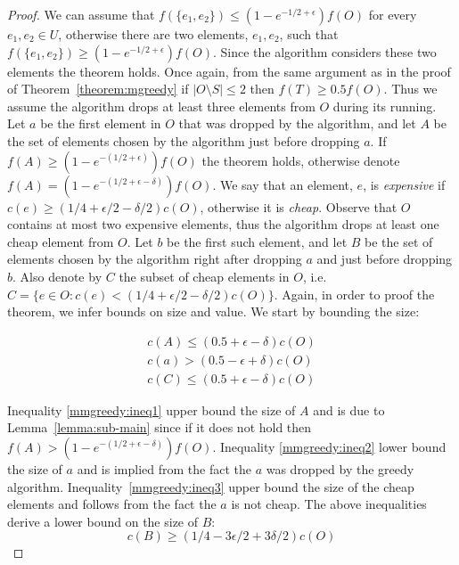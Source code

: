 \def\eps{0.104}
\begin{proof}
We can assume that $f(\{e_1, e_2\}) \leq (1 - e^{-1/2 + \epsilon})f(O)$ 
for every $e_1, e_2 \in U$, otherwise there are two elements, $e_1, e_2$, such that $f(\{e_1, e_2\}) \geq (1 - e^{-1/2 + \epsilon})f(O)$. 
Since the algorithm considers these two elements the theorem holds.
% 
Once again, from the same argument as in the proof of Theorem~\ref{theorem:mgreedy} if $|O \setminus S| \leq 2$ then $f(T) \geq 0.5f(O)$.
Thus we assume the algorithm drops at least three elements from $O$ during its running.
Let $a$ be the first element in $O$ that was dropped by the algorithm, 
and let $A$ be the set of elements chosen by the algorithm just before dropping $a$.
If $f(A) \geq (1 - e^{-(1/2 + \epsilon)})f(O)$ the theorem holds, 
otherwise denote $f(A) = (1 - e^{-(1/2 + \epsilon - \delta)})f(O)$.
We say that an element, $e$, is \emph{expensive} if $c(e) \geq (1/4 + \epsilon/2 - \delta/2)c(O)$, 
otherwise it is \emph{cheap}.
Observe that $O$ contains at most two expensive elements, thus the algorithm drops 
at least one cheap element from $O$. 
Let $b$ be the first such element, and let $B$ be the set of elements chosen by the 
algorithm right after dropping $a$ and just before dropping $b$.
Also denote by $C$ the subset of cheap elements in $O$, 
i.e. $C = \{e \in O : c(e) < (1/4 + \epsilon/2 - \delta/2)c(O)\}$.
Again, in order to proof the theorem, we infer bounds on size and value.
We start by bounding the size:

\begin{align}
\label{mmgreedy:ineq1}
c(A) \leq (0.5 + \epsilon - \delta)c(O)
\\
\label{mmgreedy:ineq2}
c(a) > (0.5 -\epsilon + \delta)c(O)
\\
\label{mmgreedy:ineq3}
c(C) \leq (0.5 + \epsilon - \delta)c(O)
\end{align}

Inequality \ref{mmgreedy:ineq1} upper bound the size of $A$ and is due to Lemma~\ref{lemma:sub-main} since if it does not hold then $f(A) > (1 - e^{-(1/2 + \epsilon - \delta)})f(O)$.
Inequality \ref{mmgreedy:ineq2} lower bound the size of $a$ and is implied from the fact the $a$ was dropped by the greedy algorithm.
Inequality~\ref{mmgreedy:ineq3} upper bound the size of the cheap elements and follows from the fact the $a$ is not cheap.
% 
The above inequalities derive a lower bound on the size of $B$:
\begin{equation}
	\label{mmgreedy:lower-bound-cB}
	c(B) \geq (1/4 - 3\epsilon/2 + 3\delta/2)c(O)
\end{equation}


\end{proof}
